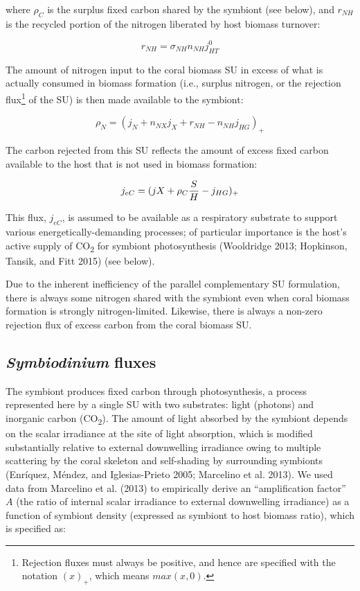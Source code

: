 \documentclass[]{elsarticle} %
\begin{document}
where \(\rho_C\) is the surplus fixed carbon shared by the symbiont (see
below), and \(r_{NH}\) is the recycled portion of the nitrogen liberated
by host biomass turnover:

\begin{equation} r_{NH}=\sigma_{NH}n_{NH}j_{HT}^0 \end{equation}

The amount of nitrogen input to the coral biomass SU in excess of what
is actually consumed in biomass formation (i.e., surplus nitrogen, or
the rejection flux\footnote{Rejection fluxes must always be positive,
  and hence are specified with the notation \((x)_+\), which means
  \(max(x, 0)\).} of the SU) is then made available to the symbiont:

\begin{equation} \rho_N = (j_N + n_{NX}j_X + r_{NH} - n_{NH}j_{HG})_+ \end{equation}

The carbon rejected from this SU reflects the amount of excess fixed
carbon available to the host that is not used in biomass formation:

\begin{equation} j_{eC} = (jX + \rho_C{S \over H} - j_{HG})_+ \end{equation}

This flux, \(j_{eC}\), is assumed to be available as a respiratory
substrate to support various energetically-demanding processes; of
particular importance is the host's active supply of CO\textsubscript{2}
for symbiont photosynthesis (Wooldridge 2013; Hopkinson, Tansik, and
Fitt 2015) (see below).

Due to the inherent inefficiency of the parallel complementary SU
formulation, there is always some nitrogen shared with the symbiont even
when coral biomass formation is strongly nitrogen-limited. Likewise,
there is always a non-zero rejection flux of excess carbon from the
coral biomass SU.

\subsection{\texorpdfstring{\emph{Symbiodinium}
fluxes}{Symbiodinium fluxes}}\label{symbiodinium-fluxes}

The symbiont produces fixed carbon through photosynthesis, a process
represented here by a single SU with two substrates: light (photons) and
inorganic carbon (CO\textsubscript{2}). The amount of light absorbed by
the symbiont depends on the scalar irradiance at the site of light
absorption, which is modified substantially relative to external
downwelling irradiance owing to multiple scattering by the coral
skeleton and self-shading by surrounding symbionts (Enríquez, Méndez,
and Iglesias-Prieto 2005; Marcelino et al. 2013). We used data from
Marcelino et al. (2013) to empirically derive an ``amplification
factor'' \(A\) (the ratio of internal scalar irradiance to external
downwelling irradiance) as a function of symbiont density (expressed as
symbiont to host biomass ratio), which is specified as:
\end{document}
